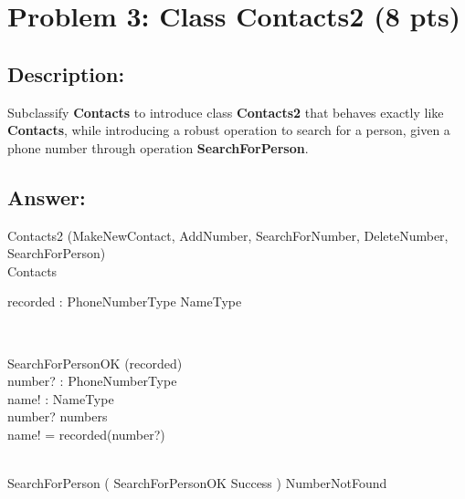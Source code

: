\newpage
\section{Problem 3: Class Contacts2 (8 pts)}

\subsection{Description:}
Subclassify \textbf{Contacts} to introduce class \textbf{Contacts2} that behaves exactly like \textbf{Contacts},
while introducing a robust operation to search for a person, given a phone number through
operation \textbf{SearchForPerson}.

\subsection{Answer:}

\begin{class}{Contacts2}
\also
\upharpoonright (MakeNewContact, AddNumber, SearchForNumber, DeleteNumber,\\ SearchForPerson) \\
Contacts\\
\begin{state}
 recorded : PhoneNumberType \pfun NameType
\end{state} \\
\begin{op}{SearchForPersonOK}
\Xi (recorded) \\
number? : PhoneNumberType \\
name! : NameType\\
\ST
number? \in numbers\\
name! = recorded(number?)
\end{op}\\
\also
SearchForPerson \sdef ( SearchForPersonOK \land Success ) \oplus NumberNotFound\\
\end{class}
